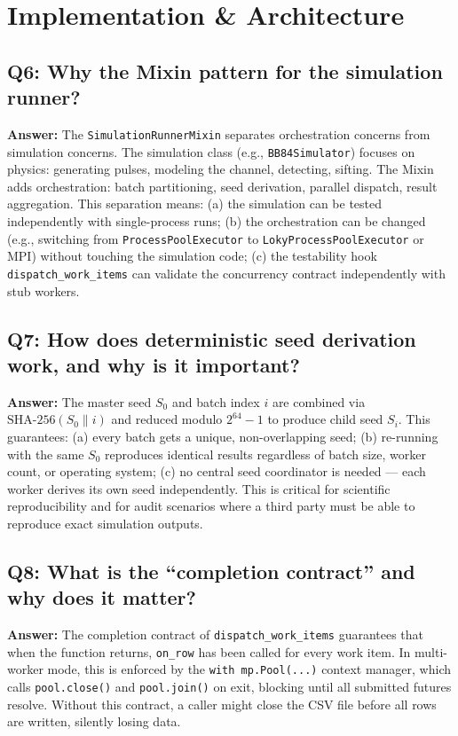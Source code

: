\documentclass[11pt,a4paper,oneside]{report}
\begin{document}
\section{Implementation \& Architecture}

\subsection*{Q6: Why the Mixin pattern for the simulation runner?}
\textbf{Answer:} The \texttt{SimulationRunnerMixin} separates orchestration concerns from simulation concerns. The simulation class (e.g., \texttt{BB84Simulator}) focuses on physics: generating pulses, modeling the channel, detecting, sifting. The Mixin adds orchestration: batch partitioning, seed derivation, parallel dispatch, result aggregation. This separation means: (a) the simulation can be tested independently with single-process runs; (b) the orchestration can be changed (e.g., switching from \texttt{ProcessPoolExecutor} to \texttt{LokyProcessPoolExecutor} or MPI) without touching the simulation code; (c) the testability hook \texttt{dispatch\_work\_items} can validate the concurrency contract independently with stub workers.

\subsection*{Q7: How does deterministic seed derivation work, and why is it important?}
\textbf{Answer:} The master seed $S_0$ and batch index $i$ are combined via $\text{SHA-256}(S_0\|i)$ and reduced modulo $2^{64}-1$ to produce child seed $S_i$. This guarantees: (a) every batch gets a unique, non-overlapping seed; (b) re-running with the same $S_0$ reproduces identical results regardless of batch size, worker count, or operating system; (c) no central seed coordinator is needed — each worker derives its own seed independently. This is critical for scientific reproducibility and for audit scenarios where a third party must be able to reproduce exact simulation outputs.

\subsection*{Q8: What is the ``completion contract'' and why does it matter?}
\textbf{Answer:} The completion contract of \texttt{dispatch\_work\_items} guarantees that when the function returns, \texttt{on\_row} has been called for every work item. In multi-worker mode, this is enforced by the \texttt{with mp.Pool(...)} context manager, which calls \texttt{pool.close()} and \texttt{pool.join()} on exit, blocking until all submitted futures resolve. Without this contract, a caller might close the CSV file before all rows are written, silently losing data.
\end{document}
